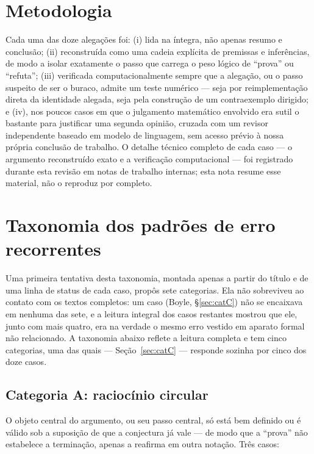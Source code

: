 \documentclass[11pt]{article}
\begin{document}
\section{Metodologia}
\label{sec:methodology}

Cada uma das doze alegações foi: (i) lida na íntegra, não apenas
resumo e conclusão; (ii) reconstruída como uma cadeia explícita de
premissas e inferências, de modo a isolar exatamente o passo que carrega
o peso lógico de ``prova'' ou ``refuta''; (iii) verificada
computacionalmente sempre que a alegação, ou o passo suspeito de ser o
buraco, admite um teste numérico --- seja por reimplementação direta da
identidade alegada, seja pela construção de um contraexemplo dirigido;
e (iv), nos poucos casos em que o julgamento matemático envolvido era
sutil o bastante para justificar uma segunda opinião, cruzada com um
revisor independente baseado em modelo de linguagem, sem acesso prévio
à nossa própria conclusão de trabalho. O detalhe técnico completo de
cada caso --- o argumento reconstruído exato e a verificação
computacional --- foi registrado durante esta revisão em notas de
trabalho internas; esta nota resume esse material, não o reproduz por
completo.

\section{Taxonomia dos padrões de erro recorrentes}
\label{sec:taxonomy}

Uma primeira tentativa desta taxonomia, montada apenas a partir do
título e de uma linha de status de cada caso, propôs sete categorias.
Ela não sobreviveu ao contato com os textos completos: um caso (Boyle,
\S\ref{sec:catC}) não se encaixava em nenhuma das sete, e a leitura
integral dos casos restantes mostrou que ele, junto com mais quatro,
era na verdade o mesmo erro vestido em aparato formal não relacionado.
A taxonomia abaixo reflete a leitura completa e tem cinco categorias,
uma das quais --- Seção~\ref{sec:catC} --- responde sozinha por cinco
dos doze casos.

\subsection{Categoria A: raciocínio circular}
\label{sec:catA}

O objeto central do argumento, ou seu passo central, só está bem
definido ou é válido sob a suposição de que a conjectura já vale --- de
modo que a ``prova'' não estabelece a terminação, apenas a reafirma em
outra notação. Três casos:
\end{document}

